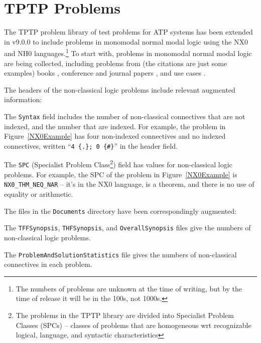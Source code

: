 \documentclass[runningheads]{llncs}
\newenvironment{packed_itemize}{
\vspace*{-0.5em}
\begin{itemize}
\setlength{\partopsep}{0pt}
\setlength{\itemsep}{1pt}
\setlength{\parskip}{0pt}
\setlength{\parsep}{0pt}
}{\end{itemize}}
\begin{document}
\section{TPTP Problems}
\label{TPTP}

The TPTP problem library of test problems for ATP systems has been extended in v9.0.0 to include
problems in monomodal normal modal logic using the NX0 and NH0 languages.\footnote{%
The numbers of problems are unknown at the time of writing, but by the time of release it will
be in the 100s, not 1000s.}
To start with, problems in monomodal normal modal logic are being collected, including problems 
from (the citations are just some examples)
books \cite{For94,FM98,Gir00,Sid10}, 
conference and journal papers \cite{Rei92,FH+98,Sto00,PN+21}, 
and 
use cases \cite{BW14-ECAI,MR22}.

The headers of the non-classical logic problems include relevant augmented information:
\begin{packed_itemize}
\item The {\tt Syntax} field includes the number of non-classical connectives that are not indexed,
      and the number that are indexed.
      For example, the problem in Figure~\ref{NX0Example} has four non-indexed connectives and
      no indexed connectives, written ``{\tt 4 \{.\};   0 \{\#\}}'' in the header field.
\item The {\tt SPC} (Specialist Problem Class\footnote{%
      The problems in the TPTP library are divided into Specialist Problem Classes (SPCs) – 
      classes of problems that are homogeneous wrt recognizable logical, language, and syntactic 
      characteristics}) field has values for non-classical logic problems. 
      For example, the SPC of the problem in Figure~\ref{NX0Example} is {\tt NX0\_THM\_NEQ\_NAR} 
      -- it's in the NX0 language, is a theorem, and there is no use of equality or arithmetic.
\end{packed_itemize}

The files in the {\tt Documents} directory have been correspondingly augmented:
\begin{packed_itemize}
\item The {\tt TFFSynopsis}, {\tt THFSynopsis}, and {\tt OverallSynopsis} files give the numbers 
      of non-classical logic problems.
\item The {\tt ProblemAndSolutionStatistics} file gives the numbers of non-classical
      connectives in each problem.
\end{packed_itemize}
\end{document}
